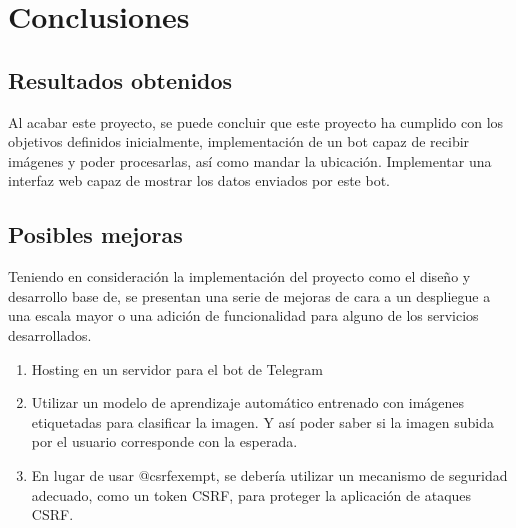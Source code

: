 \chapter{Conclusiones}\label{int}
\thispagestyle{fancy}


\section{Resultados obtenidos}
Al acabar este proyecto, se puede concluir que este proyecto ha cumplido con los objetivos definidos inicialmente, implementación de un bot capaz de recibir imágenes y poder procesarlas, así como mandar la ubicación. Implementar una interfaz web capaz de mostrar los datos enviados por este bot.
\section{Posibles mejoras}
Teniendo en consideración la implementación del proyecto como el diseño y desarrollo base de, se presentan una serie
de mejoras de cara a un despliegue a una escala mayor o una adición de funcionalidad para
alguno de los servicios desarrollados.
\begin{enumerate}
\item Hosting en un servidor para el bot de Telegram
\item Utilizar un modelo de aprendizaje automático entrenado con imágenes etiquetadas para clasificar la imagen. Y así poder saber si la imagen subida por el usuario corresponde con la esperada.
\item En lugar de usar @csrfexempt, se debería utilizar un mecanismo de seguridad adecuado, como un token CSRF, para proteger la aplicación de ataques CSRF.
\end{enumerate}